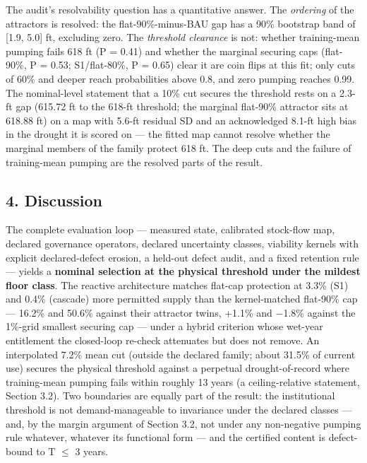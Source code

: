 \documentclass[11pt]{article}
\begin{document}
The audit's resolvability question has a quantitative answer. The
\emph{ordering} of the attractors is resolved: the flat-90\%-minus-BAU
gap has a 90\% bootstrap band of {[}1.9, 5.0{]} ft, excluding zero. The
\emph{threshold clearance} is not: whether training-mean pumping fails
618 ft (P = 0.41) and whether the marginal securing caps (flat-90\%, P =
0.53; S1/flat-80\%, P = 0.65) clear it are coin flips at this fit; only
cuts of 60\% and deeper reach probabilities above 0.8, and zero pumping
reaches 0.99. The nominal-level statement that a 10\% cut secures the
threshold rests on a 2.3-ft gap (615.72 ft to the 618-ft threshold; the
marginal flat-90\% attractor sits at 618.88 ft) on a map with 5.6-ft
residual SD and an acknowledged 8.1-ft high bias in the drought it is
scored on --- the fitted map cannot resolve whether the marginal members
of the family protect 618 ft. The deep cuts and the failure of
training-mean pumping are the resolved parts of the result.

\subsection{4. Discussion}\label{discussion}

The complete evaluation loop --- measured state, calibrated stock-flow
map, declared governance operators, declared uncertainty classes,
viability kernels with explicit declared-defect erosion, a held-out
defect audit, and a fixed retention rule --- yields a \textbf{nominal
selection at the physical threshold under the mildest floor class}. The
reactive architecture matches flat-cap protection at 3.3\% (S1) and
0.4\% (cascade) more permitted supply than the kernel-matched flat-90\%
cap --- 16.2\% and 50.6\% against their attractor twins, +1.1\% and
\ensuremath{-}1.8\% against the 1\%-grid smallest securing cap --- under a hybrid
criterion whose wet-year entitlement the closed-loop re-check attenuates
but does not remove. An interpolated 7.2\% mean cut (outside the
declared family; about 31.5\% of current use) secures the physical
threshold against a perpetual drought-of-record where training-mean
pumping fails within roughly 13 years (a ceiling-relative statement,
Section 3.2). Two boundaries are equally part of the result: the
institutional threshold is not demand-manageable to invariance under the
declared classes --- and, by the margin argument of Section 3.2, not
under any non-negative pumping rule whatever, whatever its functional
form --- and the certified content is defect-bound to T \ensuremath{\leq} 3
years.
\end{document}
